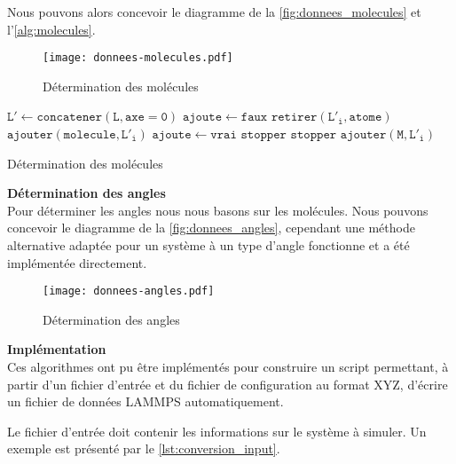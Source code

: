 Nous pouvons alors concevoir le diagramme de la \autoref{fig:donnees_molecules} et l'\autoref{alg:molecules}.

\begin{figure}[h!]
	\centering
	\texttt{[image: donnees-molecules.pdf]}
	\caption{Détermination des molécules}
	\label{fig:donnees_molecules}
\end{figure}

\begin{algorithm}[h!]
	\Deb%
	{
		$\mathtt{L' \gets concatener(L, axe=0)}$\;
		{
			$\mathtt{ajoute \gets faux}$\;
			{
				{
					{
						$\mathtt{retirer(L'_i, atome)}$\;
						$\mathtt{ajouter(molecule, L'_i)}$\;
						$\mathtt{ajoute \gets vrai}$\;
						$\mathtt{stopper}$\;
					}
				}
				{
					$\mathtt{stopper}$\;
				}
			}
			{
				$\mathtt{ajouter(M, L'_i)}$\;
			}
		}
	}
	\caption{Détermination des molécules}
	\label{alg:molecules}
\end{algorithm}

\textbf{Détermination des angles}\\
Pour déterminer les angles nous nous basons sur les molécules. Nous pouvons concevoir le diagramme de la \autoref{fig:donnees_angles}, cependant une méthode alternative adaptée pour un système à un type d'angle fonctionne et a été implémentée directement.

\begin{figure}[h!]
	\centering
	\texttt{[image: donnees-angles.pdf]}
	\caption{Détermination des angles}
	\label{fig:donnees_angles}
\end{figure}

\textbf{Implémentation}\\
Ces algorithmes ont pu être implémentés pour construire un script permettant, à partir d'un fichier d'entrée et du fichier de configuration au format XYZ, d'écrire un fichier de données LAMMPS automatiquement.

Le fichier d'entrée doit contenir les informations sur le système à simuler. Un exemple est présenté par le \autoref{lst:conversion_input}.

